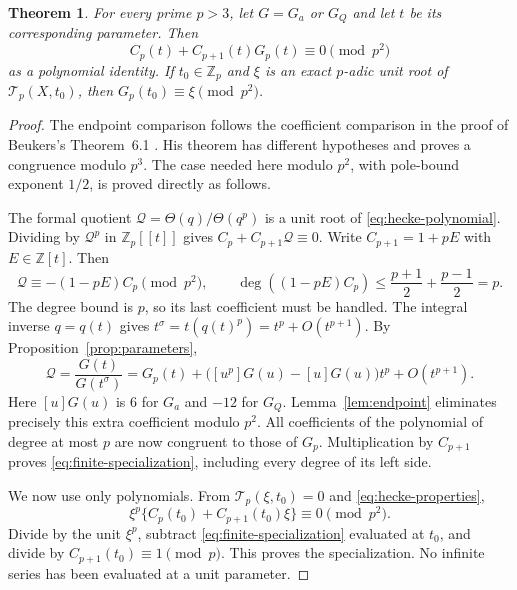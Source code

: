 \documentclass[11pt,a4paper]{article}
\newtheorem{theorem}{Theorem}[section]
\theoremstyle{remark}
\newcommand{\Z}{\mathbb Z}
\newcommand{\Zp}{\mathbb Z_p}
\begin{document}
\begin{theorem}\label{thm:specialization}
For every prime $p>3$, let $G=G_a$ or $G_Q$ and let $t$ be its
corresponding parameter. Then
\begin{equation}\label{eq:finite-specialization}
 C_p(t)+C_{p+1}(t)G_p(t)\equiv0\pmod{p^2}
\end{equation}
as a polynomial identity. If $t_0\in\Zp$ and $\xi$ is an exact
$p$-adic unit root of $\mathscr T_p(X,t_0)$, then
$G_p(t_0)\equiv\xi\pmod{p^2}$.
\end{theorem}
\begin{proof}
The endpoint comparison follows the coefficient comparison in the
proof of Beukers's Theorem~6.1 \cite[p.~24]{beukers}. His theorem has different
hypotheses and proves a congruence modulo $p^3$. The case needed
here modulo $p^2$, with pole-bound exponent $1/2$, is proved directly
as follows.

The formal quotient $\mathcal Q=\Theta(q)/\Theta(q^p)$ is a unit
root of \eqref{eq:hecke-polynomial}. Dividing by
$\mathcal Q^p$ in $\Zp[[t]]$ gives
$C_p+C_{p+1}\mathcal Q\equiv0$. Write $C_{p+1}=1+pE$ with
$E\in\Z[t]$. Then
\[
 \mathcal Q\equiv-(1-pE)C_p\pmod{p^2},\qquad
 \deg((1-pE)C_p)\le\frac{p+1}2+\frac{p-1}2=p.
\]
The degree bound is $p$, so its last coefficient must be handled.
The integral inverse $q=q(t)$ gives
$t^\sigma=t(q(t)^p)=t^p+O(t^{p+1})$. By
Proposition~\ref{prop:parameters},
\[
 \mathcal Q=\frac{G(t)}{G(t^\sigma)}
   =G_p(t)+\bigl([u^p]G(u)-[u]G(u)\bigr)t^p+O(t^{p+1}).
\]
Here $[u]G(u)$ is $6$ for $G_a$ and $-12$ for $G_Q$.
Lemma~\ref{lem:endpoint} eliminates precisely this extra coefficient
modulo $p^2$. All coefficients of the polynomial of degree at most
$p$ are now congruent to those of $G_p$. Multiplication by
$C_{p+1}$ proves \eqref{eq:finite-specialization}, including every
degree of its left side.

We now use only polynomials. From
$\mathscr T_p(\xi,t_0)=0$ and \eqref{eq:hecke-properties},
\[
 \xi^p\{C_p(t_0)+C_{p+1}(t_0)\xi\}\equiv0\pmod{p^2}.
\]
Divide by the unit $\xi^p$, subtract
\eqref{eq:finite-specialization} evaluated at $t_0$, and divide
by $C_{p+1}(t_0)\equiv1\pmod p$. This proves the specialization.
No infinite series has been evaluated at a unit parameter.
\end{proof}
\end{document}
